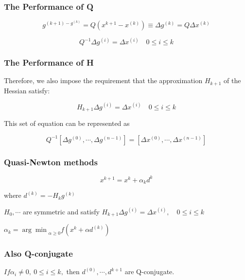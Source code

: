 
\begin{frame}
	\frametitle{The Performance of Q}
	
	$$g^{(k+1) - g^{(k)}} = Q(x^{k+1} - x^{(k)})  \equiv \Delta g^{(k)} = Q \Delta x^{(k)}$$
	
	$$Q^{-1} \Delta g^{(i)} = \Delta x^{(i)} \quad 0 \leq i \leq k$$
\end{frame}

\begin{frame}
	\frametitle{The Performance of H}
	
	Therefore, we also impose the requirement that the approximation $H_{k+1}$ of the Hessian satisfy:
	
	$$H_{k+1} \Delta g^{(i)} = \Delta x^{(i)} \quad 0 \leq i \leq k$$
	
\end{frame}

\begin{frame}
	This set of equation can be represented as
	
	$$Q^{-1}[\Delta g^{(0)},\cdots,\Delta g^{(n-1)}] = [\Delta x^{(0)},\cdots,\Delta x^{(n-1)}]$$
	
\end{frame}


\begin{frame}
	\frametitle{Quasi-Newton methods}
	
	$$x^{k+1} = x^{k} + \alpha_k d^{k}$$
	
	where $d^{(k)} = -H_kg^{(k)}$
	
	$H_0,\cdots$ are symmetric and satisfy $H_{k+1}\Delta g^{(i)} = \Delta x^{(i)}, \quad 0\leq i \leq k$
	
	$\alpha_k = {\arg\min}_{\alpha \geq 0} f(x^{k} + \alpha d^{(k)})$
\end{frame}


\begin{frame}
	\frametitle{Also Q-conjugate}
	
	$If \alpha_i \neq 0,~0\leq i \leq k,$ then $d^{(0)},\cdots , d^{k+1}$ are Q-conjugate.
\end{frame}

